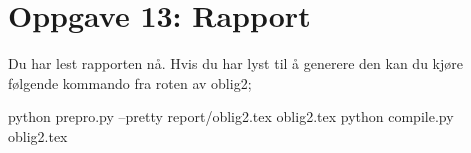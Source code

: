 \section*{Oppgave 13: Rapport}

Du har lest rapporten nå. Hvis du har lyst til å generere den kan du kjøre følgende kommando fra roten av oblig2;

python prepro.py --pretty report/oblig2.tex oblig2.tex
python compile.py oblig2.tex
